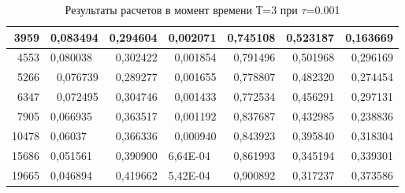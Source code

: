\documentclass[14pt]{article}
\begin{document}
\begin{table}[!h!]
\begin{tabular}{|r|r|r|r|r|r|r|}
3959                    & 0,083494                      & 0,294604                  & 0,002071                      & 0,745108                  & 0,523187                    & 0,163669                    \\ \hline
4553                    & \multicolumn{1}{l|}{0,080038} & 0,302422                  & 0,001854                      & 0,791496                  & 0,501968                    & 0,296169                    \\ \hline
5266                    & 0,076739                      & 0,289277                  & 0,001655                      & 0,778807                  & 0,482320                    & 0,274454                    \\ \hline
6347                    & 0,072495                      & 0,304746                  & 0,001433                      & 0,772534                  & 0,456291                    & 0,297131                    \\ \hline
7905                    & \multicolumn{1}{l|}{0,066935} & 0,363517                  & 0,001192                      & 0,837687                  & 0,432985                    & 0,238836                    \\ \hline
10478                   & \multicolumn{1}{l|}{0,06037}  & 0,366336                  & 0,000940                      & 0,843923                  & 0,395840                    & 0,318304                    \\ \hline
15686                   & \multicolumn{1}{l|}{0,051561} & 0,390900                  & \multicolumn{1}{l|}{6,64E-04} & 0,861993                  & 0,345194                    & 0,339301                    \\ \hline
19665                   & \multicolumn{1}{l|}{0,046894} & 0,419662                  & \multicolumn{1}{l|}{5,42E-04} & 0,900892                  & 0,317237                    & 0,373586                    \\ \hline
\end{tabular}
\caption{Результаты расчетов в момент времени Т=3 при $\tau$=0.001}
\end{table}
\end{document}
